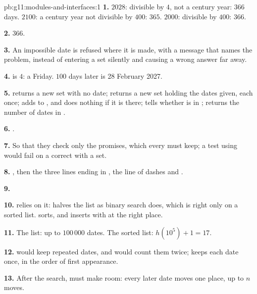 \begin{solution}{pb:g11:modules-and-interfaces:1}
\textbf{1.} $2028$: divisible by $4$, not a century year: $366$ days. $2100$: a century year not divisible by $400$:
$365$. $2000$: divisible by $400$: $366$.

\textbf{2.} $366$.

\textbf{3.} An impossible date is refused where it is made, with a message that names the problem, instead of
entering a set silently and causing a wrong answer far away.

\textbf{4.}  is $4$: a Friday. $100$ days later is 28 February 2027.

\textbf{5.}  returns a new set with no date;  returns a new set holding the dates
given, each once;  adds  to , and does nothing if it is there; 
tells whether  is in ;  returns the number of dates in .

\textbf{6.} .

\textbf{7.} So that they check only the promises, which every  must keep; a test using 
would fail on a correct  with a set.

\textbf{8.} , then the three lines ending in , the line of dashes and
.

\textbf{9.}

\smallskip\noindent\hspace*{2em}

\noindent\hspace*{4em}

\smallskip
\textbf{10.}  relies on it:  halves the list as binary search does, which is right only
on a sorted list.  sorts, and  inserts with  at the right place.

\textbf{11.} The list: up to $100\,000$ dates. The sorted list: $h(10^5) + 1 = 17$.

\textbf{12.}  would keep repeated dates, and  would count them twice;
 keeps each date once, in the order of first appearance.

\textbf{13.} After the search,  must make room: every later date moves one place, up to $n$ moves.


\end{solution}
